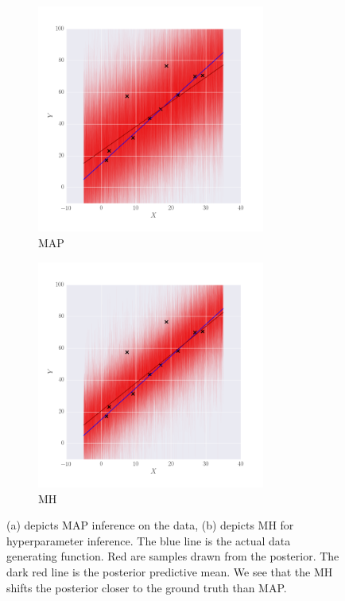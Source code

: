 \begin{figure}
        \centering
        \begin{subfigure}[b]{0.49\textwidth} \centering
              \includegraphics[height=7.5cm]{figs/MAP_linear.png}
              \caption{MAP}
                \label{fig:maplin}
        \end{subfigure}%
        \begin{subfigure}[b]{0.49\textwidth} \centering
            \includegraphics[height=7.5cm]{figs/MH_linear.png}
            \caption{MH}
                \label{fig:mhlin}
        \end{subfigure}%
        \caption{(a) depicts \ac{MAP} inference on the data, (b) depicts MH for hyperparameter inference. The blue line is the actual data generating function. Red are samples drawn from the posterior. The dark red line is the posterior predictive mean. We see that the MH shifts the posterior closer to the ground truth than MAP.  }\label{fig:BayesVSFreq}
\end{figure}

